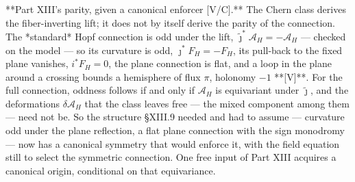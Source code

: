 **Part XIII's parity, given a canonical enforcer [V/C].** The Chern class derives the fiber-inverting lift; it does not by itself derive the parity of the connection. The *standard* Hopf connection is odd under the lift, $\widetilde\jmath^*\mathcal A_H = -\mathcal A_H$ — checked on the model — so its curvature is odd, $\jmath^*F_H = -F_H$, its pull-back to the fixed plane vanishes, $i^*F_H = 0$, the plane connection is flat, and a loop in the plane around a crossing bounds a hemisphere of flux $\pi$, holonomy $-1$ **[V]**. For the full connection, oddness follows if and only if $\mathcal A_H$ is equivariant under $\widetilde\jmath$, and the deformations $\delta\mathcal A_H$ that the class leaves free — the mixed component among them — need not be. So the structure §XIII.9 needed and had to assume — curvature odd under the plane reflection, a flat plane connection with the sign monodromy — now has a canonical symmetry that would enforce it, with the field equation still to select the symmetric connection. One free input of Part XIII acquires a canonical origin, conditional on that equivariance.

